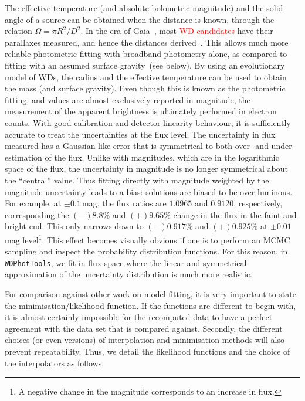 \documentclass[fleqn,usenatbib]{rasti}
\begin{document}
The effective temperature (and absolute bolometric magnitude) and the solid
angle of a source can be obtained when the distance is known, through the
relation $\Omega = \pi R^2 / D^2$. In the era of
Gaia~\citep{2021A&A...649A...1G}, most \textcolor{red}{WD candidates} have their parallaxes
measured, and hence the distances derived~\citep{2021AJ....161..147B}. This
allows much more reliable photometric fitting with broadband photometry alone,
as compared to fitting with an assumed surface gravity~(see below). By using
an evolutionary model of WDs, the radius and the effective temperature can be
used to obtain the mass (and surface gravity). Even though this is known as
the photometric fitting, and values are almost exclusively reported in
magnitude, the measurement of the apparent brightness is ultimately performed
in electron counts. With good calibration and detector linearity behaviour, it
is sufficiently accurate to treat the uncertainties at the flux level. The
uncertainty in flux measured has a Gaussian-like error that is symmetrical
to both over- and under-estimation of the flux. Unlike with magnitudes,
which are in the logarithmic space of the flux, the uncertainty in magnitude
is no longer symmetrical about the ``central'' value. Thus fitting directly
with magnitude weighted by the magnitude uncertainty leads to a bias: solutions
are biased to be over-luminous. For example, at $\pm0.1$\,mag, the flux
ratios are $1.0965$ and $0.9120$, respectively, corresponding the $(-)8.8\%$
and $(+)9.65\%$ change in the flux in the faint and bright end. This only
narrows down to $(-)0.917\%$ and $(+)0.925\%$ at $\pm0.01\,$mag
level\footnote{A negative change in the magnitude corresponds to an increase in
flux.}. This effect becomes visually obvious if one is to perform an MCMC
sampling and inspect the probability distribution functions. For this reason,
in \verb+WDPhotTools+, we fit in flux-space where the linear and symmetrical
approximation of the uncertainty distribution is much more realistic.

For comparison against other work on model fitting, it is very important to
state the minimisation/likelihood function. If the functions are different to
begin with, it is almost certainly impossible for the recomputed data to
have a perfect agreement with the data set that is compared against. Secondly, the
different choices (or even versions) of interpolation and minimisation methods
will also prevent repeatability. Thus, we detail the likelihood functions
and the choice of the interpolators as follows.
\end{document}
